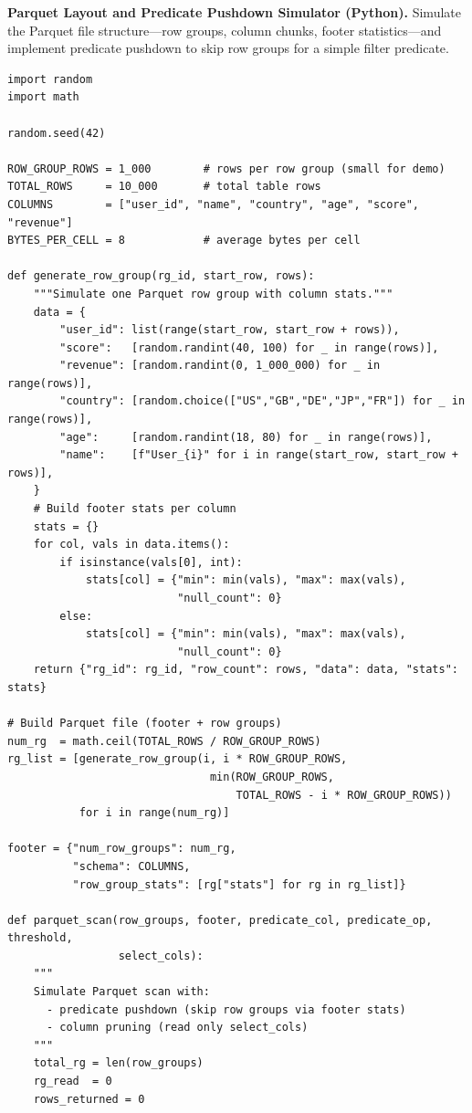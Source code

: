\pe \textbf{Parquet Layout and Predicate Pushdown Simulator (Python).}
Simulate the Parquet file structure---row groups, column chunks,
footer statistics---and implement predicate pushdown to skip row groups
for a simple filter predicate.

\begin{lstlisting}[style=pyspark, caption={PE5.2: Parquet predicate pushdown simulator}]
import random
import math

random.seed(42)

ROW_GROUP_ROWS = 1_000        # rows per row group (small for demo)
TOTAL_ROWS     = 10_000       # total table rows
COLUMNS        = ["user_id", "name", "country", "age", "score", "revenue"]
BYTES_PER_CELL = 8            # average bytes per cell

def generate_row_group(rg_id, start_row, rows):
    """Simulate one Parquet row group with column stats."""
    data = {
        "user_id": list(range(start_row, start_row + rows)),
        "score":   [random.randint(40, 100) for _ in range(rows)],
        "revenue": [random.randint(0, 1_000_000) for _ in range(rows)],
        "country": [random.choice(["US","GB","DE","JP","FR"]) for _ in range(rows)],
        "age":     [random.randint(18, 80) for _ in range(rows)],
        "name":    [f"User_{i}" for i in range(start_row, start_row + rows)],
    }
    # Build footer stats per column
    stats = {}
    for col, vals in data.items():
        if isinstance(vals[0], int):
            stats[col] = {"min": min(vals), "max": max(vals),
                          "null_count": 0}
        else:
            stats[col] = {"min": min(vals), "max": max(vals),
                          "null_count": 0}
    return {"rg_id": rg_id, "row_count": rows, "data": data, "stats": stats}

# Build Parquet file (footer + row groups)
num_rg  = math.ceil(TOTAL_ROWS / ROW_GROUP_ROWS)
rg_list = [generate_row_group(i, i * ROW_GROUP_ROWS,
                               min(ROW_GROUP_ROWS,
                                   TOTAL_ROWS - i * ROW_GROUP_ROWS))
           for i in range(num_rg)]

footer = {"num_row_groups": num_rg,
          "schema": COLUMNS,
          "row_group_stats": [rg["stats"] for rg in rg_list]}

def parquet_scan(row_groups, footer, predicate_col, predicate_op, threshold,
                 select_cols):
    """
    Simulate Parquet scan with:
      - predicate pushdown (skip row groups via footer stats)
      - column pruning (read only select_cols)
    """
    total_rg = len(row_groups)
    rg_read  = 0
    rows_returned = 0


\end{lstlisting}

